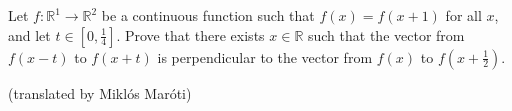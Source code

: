 Let $f\colon \mathbb{R}^1\rightarrow \mathbb{R}^2$ be a continuous function such that $f(x)=f(x+1)$ for all $x$, and let $t\in [0,\frac14]$. Prove that there exists $x\in\mathbb{R}$ such that the vector from $f(x-t)$ to $f(x+t)$ is perpendicular to the vector from $f(x)$ to $f(x+\frac12)$.

(translated by Miklós Maróti)
